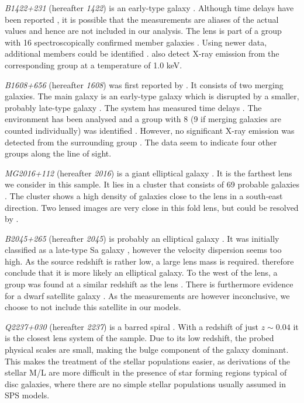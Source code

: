 \documentclass[useAMS,usenatbib]{mn2e}
\begin{document}
\textit{B1422+231} (hereafter \textit{1422}) is an early-type galaxy \citep{1992MNRAS.259P...1P,1994AJ....107...28Y}. Although time delays have been reported \citep{2001MNRAS.326.1403P}, it is possible that the measurements are aliases of the actual values \citep{2003AJ....126...29R} and hence are not included in our analysis. The lens is part of a group with 16 spectroscopically confirmed member galaxies \citep{2006ApJ...641..169M}. Using newer data, additional members could be identified \citep{2011ApJ...726...84W}. \cite{2004ApJ...610..686G} also detect X-ray emission from the corresponding group at a temperature of 1.0 keV.

\textit{B1608+656} (hereafter \textit{1608}) was first reported by \cite{1995ApJ...447L...5M}. It consists of two merging galaxies. The main galaxy is an early-type galaxy which is disrupted by a smaller, probably late-type galaxy \citep{2003ApJ...584..100S}. The system has measured time delays \citep{2002ApJ...581..823F}. The environment has been analysed and a group with 8 (9 if merging galaxies are counted individually) was identified \citep{2006ApJ...642...30F}. However, no significant X-ray emission was detected from the surrounding group \citep{2005ApJ...625..633D}. The data seem to indicate four other groups along the line of sight.

\textit{MG2016+112} (hereafter \textit{2016}) is a giant elliptical galaxy \citep{1984Sci...223...46L,1986AJ.....91..991S}. It is the farthest lens we consider in this sample. It lies in a cluster that consists of 69 probable galaxies \citep{2003MNRAS.344..337T}. The cluster shows a high density of galaxies close to the lens in a south-east direction. Two lensed images are very close in this fold lens, but could be resolved by \cite{2009MNRAS.394..174M}.

\textit{B2045+265} (hereafter \textit{2045}) is probably an elliptical galaxy \citep{2007MNRAS.378..109M}. It was initially classified as a late-type Sa galaxy \citep{1999AJ....117..658F}, however the velocity dispersion seems too high. As the source redshift is rather low, a large lens mass is required. \cite{2007MNRAS.378..109M} therefore conclude that it is more likely an elliptical galaxy. To the west of the lens, a group was found at a similar redshift as the lens \citep{1999AJ....117..658F}. There is furthermore evidence for a dwarf satellite galaxy \citep{2007MNRAS.378..109M}. As the measurements are however inconclusive, we choose to not include this satellite in our models.

\textit{Q2237+030} (hereafter \textit{2237}) is a barred spiral \citep{1988AJ.....95.1331Y}. With a redshift of just $z\sim0.04$ it is the closest lens system of the sample. Due to its low redshift, the probed physical scales are small, making the bulge component of the galaxy dominant. This makes the treatment of the stellar populations easier, as derivations of the stellar M/L are more difficult in the presence of star forming regions typical of disc galaxies, where there are no simple stellar populations usually assumed in SPS models.
\end{document}
